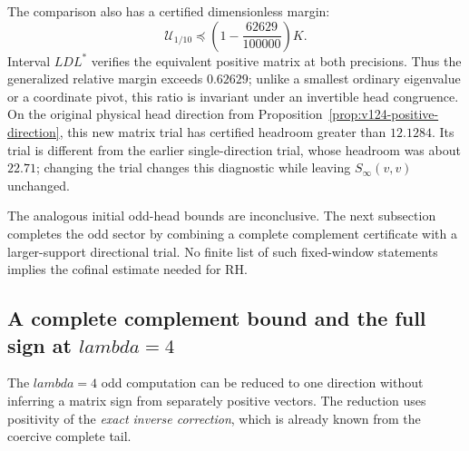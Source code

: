 \documentclass[11pt]{article}
\def\lambda{lambda}%
\theoremstyle{remark}
\begin{document}
The comparison also has a certified dimensionless margin:
\begin{equation}\label{eq:v125-relative-margin}
 \mathcal U_{1/10}\preceq
 \left(1-\frac{62629}{100000}\right)K.
\end{equation}
Interval $LDL^*$ verifies the equivalent positive matrix at both
precisions.  Thus the generalized relative margin exceeds $0.62629$;
unlike a smallest ordinary eigenvalue or a coordinate pivot, this
ratio is invariant under an invertible head congruence.  On the
original physical head direction from
Proposition~\ref{prop:v124-positive-direction}, this new matrix trial
has certified headroom greater than $12.1284$.  Its trial is different
from the earlier single-direction trial, whose headroom was about
$22.71$; changing the trial changes this diagnostic while leaving
$S_\infty(v,v)$ unchanged.

The analogous initial odd-head bounds are inconclusive. The next
subsection completes the odd sector by combining a complete
complement certificate with a larger-support directional trial.
No finite list of such fixed-window statements implies the cofinal
estimate needed for RH.

\subsection{A complete complement bound and the full sign at \texorpdfstring{$\lambda=4$}{lambda=4}}

The $\lambda=4$ odd computation can be reduced to one direction
without inferring a matrix sign from separately positive vectors.
The reduction uses positivity of the \emph{exact inverse correction},
which is already known from the coercive complete tail.
\end{document}
